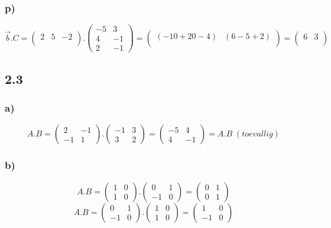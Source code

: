 \documentclass[11pt]{article}
\begin{document}
\subsubsection*{p)}
\[
\vec{b}.C=
\begin{pmatrix}
  2 & 5 & -2 \\
 \end{pmatrix}
 .
\begin{pmatrix}
  -5 & 3 \\
  4 & -1 \\
  2 & -1
 \end{pmatrix}
 =
 \begin{pmatrix}
  (-10+20-4) & (6-5+2) \\
 \end{pmatrix}
 =
 \begin{pmatrix}
  6 & 3 \\
 \end{pmatrix}
\]

\subsection*{2.3}
\subsubsection*{a)}
\[
A.B=
 \begin{pmatrix}
  2 & -1 \\
  -1 & 1
 \end{pmatrix}
 .
 \begin{pmatrix}
  -1 & 3 \\
  3 & 2
 \end{pmatrix}
 =
 \begin{pmatrix}
  -5 & 4 \\
  4 & -1
 \end{pmatrix}
 = A.B\;(toevallig)
\]
\subsubsection*{b)}
\[
A.B=
\begin{pmatrix}
1 & 0 \\
1 & 0
\end{pmatrix}
.
\begin{pmatrix}
0 & 1 \\
-1 & 0
\end{pmatrix}
=
\begin{pmatrix}
0 & 1 \\
0 & 1
\end{pmatrix}
\]
\[
A.B=
\begin{pmatrix}
0 & 1 \\
-1 & 0
\end{pmatrix}
.
\begin{pmatrix}
1 & 0 \\
1 & 0
\end{pmatrix}
=
\begin{pmatrix}
1 & 0 \\
-1 & 0
\end{pmatrix}
\]
\end{document}
